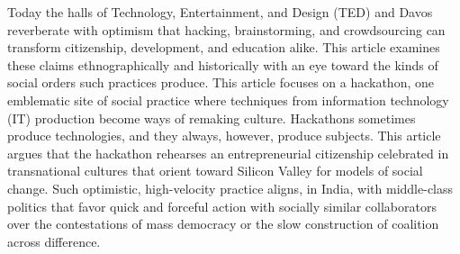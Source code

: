 Today the halls of Technology, Entertainment, and Design (TED) and Davos reverberate with optimism that hacking, brainstorming, and crowdsourcing can transform citizenship, development, and education alike. This article examines these claims ethnographically and historically with an eye toward the kinds of social orders such practices produce. This article focuses on a hackathon, one emblematic site of social practice where techniques from information technology (IT) production become ways of remaking culture. Hackathons sometimes produce technologies, and they always, however, produce subjects. This article argues that the hackathon rehearses an entrepreneurial citizenship celebrated in transnational cultures that orient toward Silicon Valley for models of social change. Such optimistic, high-velocity practice aligns, in India, with middle-class politics that favor quick and forceful action with socially similar collaborators over the contestations of mass democracy or the slow construction of coalition across difference.